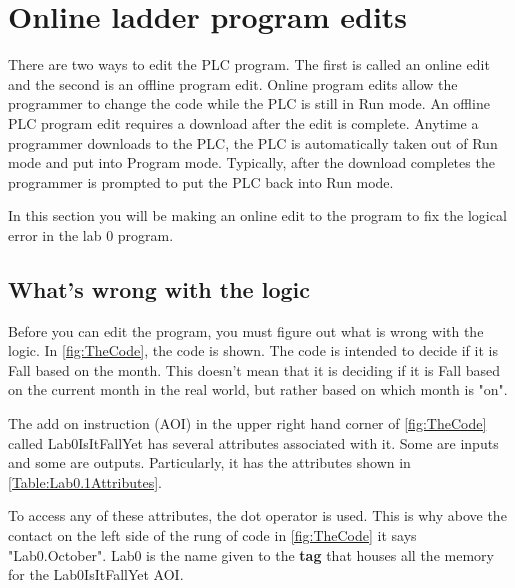 \TASignatureSlot


\section{Online ladder program edits}

There are two ways to edit the PLC program. The first is called an online edit and the second is an offline program edit. Online program edits allow the programmer to change the code while the PLC is still in Run mode. An offline PLC program edit requires a download after the edit is complete. Anytime a programmer downloads to the PLC, the PLC is automatically taken out of Run mode and put into Program mode. Typically, after the download completes the programmer is prompted to put the PLC back into Run mode.


In this section you will be making an online edit to the program to fix the logical error in the lab 0 program.

\subsection{What's wrong with the logic}

Before you can edit the program, you must figure out what is wrong with the logic. In \figureautorefname \ref{fig:TheCode}, the code is shown. The code is intended to decide if it is Fall based on the month. This doesn't mean that it is deciding if it is Fall based on the current month in the real world, but rather based on which month is "on". 

The add on instruction (AOI) in the upper right hand corner of  \figureautorefname \ref{fig:TheCode} called Lab0\textunderscore IsItFallYet has several attributes associated with it. Some are inputs and some are outputs. Particularly, it has the attributes shown in \tableautorefname \ref{Table:Lab0.1Attributes}.

To access any of these attributes, the dot operator is used. This is why above the contact on the left side of the rung of code in \figureautorefname \ref{fig:TheCode} it says "Lab0.October". Lab0 is the name given to the \textbf{tag} that houses all the memory for the Lab0\textunderscore IsItFallYet
AOI.

